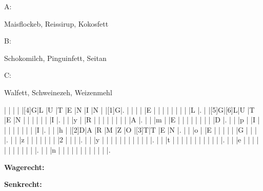 \documentclass[11pt,twoside,a4paper]{exam}
\begin{document}
\begin{minipage}[t]{0.3\textwidth}
 A:

 Maisflockeb, Reissirup, Kokosfett
\end{minipage}
\begin{minipage}[t]{0.3\textwidth}
 B: 

 Schokomilch, Pinguinfett, Seitan
\end{minipage}
\begin{minipage}[t]{0.3\textwidth}
 C:

 Walfett, Schweinezeh, Weizenmehl
\end{minipage}


\vspace{0.4in}
\begin{Puzzle}{15}{15}
  |{}  |{}  |{}  |{}  |[4]G|L   |U   |T   |E   |N   |I   |N   |{}  |[1]G|.
  |{}  |{}  |{}  |{}  |E   |{}  |{}  |{}  |{}  |{}  |{}  |{}  |{}  |L   |.
  |{}  |[5]G|[6]L|U   |T   |E   |N   |{}  |{}  |{}  |{}  |{}  |{}  |I   |.
  |{}  |{}  |y   |{}  |R   |{}  |{}  |{}  |{}  |{}  |{}  |{}  |{}  |A   |.
  |{}  |{}  |m   |{}  |E   |{}  |{}  |{}  |{}  |{}  |{}  |{}  |{}  |D   |.
  |{}  |{}  |p   |{}  |I   |{}  |{}  |{}  |{}  |{}  |{}  |{}  |{}  |I   |.
  |{}  |{}  |h   |{}  |[2]D|A   |R   |M   |Z   |O   |[3]T|T   |E   |N   |.
  |{}  |{}  |o   |{}  |E   |{}  |{}  |{}  |{}  |{}  |G   |{}  |{}  |{}  |.
  |{}  |{}  |z   |{}  |{}  |{}  |{}  |{}  |{}  |{}  |2   |{}  |{}  |{}  |.
  |{}  |{}  |y   |{}  |{}  |{}  |{}  |{}  |{}  |{}  |{}  |{}  |{}  |{}  |.
  |{}  |{}  |t   |{}  |{}  |{}  |{}  |{}  |{}  |{}  |{}  |{}  |{}  |{}  |.
  |{}  |{}  |e   |{}  |{}  |{}  |{}  |{}  |{}  |{}  |{}  |{}  |{}  |{}  |.
  |{}  |{}  |n   |{}  |{}  |{}  |{}  |{}  |{}  |{}  |{}  |{}  |{}  |{}  |.
\end{Puzzle}
\begin{PuzzleClues}{\textbf{Wagerecht:}}
\end{PuzzleClues}
\begin{PuzzleClues}{\textbf{Senkrecht:}}
\end{PuzzleClues}
\newpage
\end{document}
